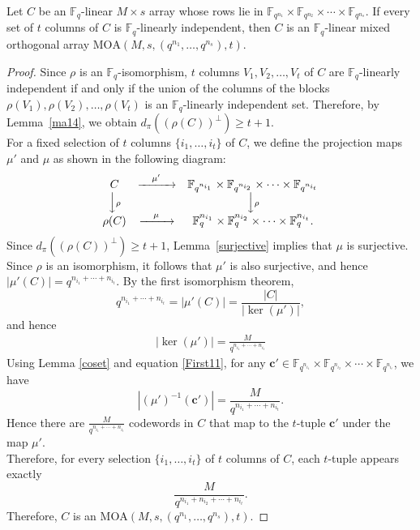 \documentclass[10pt,a4paper]{amsart}
\begin{document}
\begin{Theorem}\label{ma20}
Let $C$ be an $\mathbb F_q$-linear $M \times s$ array whose rows lie in $\mathbb{F}_{q^{n_1}}\times\mathbb{F}_{q^{n_2}}\times\cdots\times\mathbb{F}_{q^{n_s}}$. If every set of $t$ columns of $C$ is $\mathbb F_q$-linearly independent, then $C$ is an $\mathbb F_q$-linear mixed orthogonal array $\mathrm{MOA}\left(M, s, (q^{n_1}, \dots, q^{n_s}), t\right)$.
\end{Theorem}

\begin{proof}
Since $\rho$ is an $\mathbb F_q$-isomorphism, $t$ columns $V_1, V_2, \ldots, V_t$ of $C$ are $\mathbb F_q$-linearly independent if and only if the union of the columns of the blocks $\rho(V_1), \rho(V_2), \ldots, \rho(V_t)$ is an $\mathbb F_q$-linearly independent set. Therefore, by Lemma~\ref{ma14}, we obtain $d_\pi((\rho(C))^\perp)\geq t+1$.\\
For a fixed selection of $t$ columns $\{i_1,\ldots,i_t\}$ of $C$, we define the projection maps $\mu'$ and $\mu$ as shown in the following diagram:
  \begin{align}
\begin{array}{ccc}
C & \xrightarrow{\quad \mu'\quad} & \mathbb{F}_{q^{n_{i_1}}}\times\mathbb{F}_{q^{n_{i_2}}}\times\cdots\times\mathbb{F}_{q^{n_{i_t}}} \\
\Big\downarrow{\scriptstyle \rho} &  & \Big\downarrow{\scriptstyle \rho} \\
\rho(C) & \xrightarrow{\quad \mu \quad} & \mathbb{F}_{q}^{n_{i_1}}\times\mathbb{F}_{q}^{n_{i_2}}\times\cdots\times\mathbb{F}_{q}^{n_{i_t}}.
\end{array}
\end{align} 
Since $d_\pi((\rho(C))^\perp)\ge t+1$, Lemma~\ref{surjective} implies that $\mu$ is surjective. Since $\rho$ is an isomorphism, it follows that $\mu'$ is also surjective, and hence $ |\mu'(C)|=q^{n_{i_1} + \cdots + n_{i_t}}.$ By the first isomorphism theorem,
$$ q^{n_{i_1} + \cdots + n_{i_t}}=|\mu'(C)|= \frac{|C|}{|\ker(\mu')|},$$
and hence
\begin{align}\label{First11}
    |\ker(\mu')| = \frac{M}{q^{n_{i_1} + \cdots + n_{i_t}}}
\end{align}
Using Lemma \ref{coset} and equation \eqref{First11}, for any  $\boldsymbol{c}' \in  \mathbb{F}_{q^{n_{i_1}}} \times \mathbb{F}_{q^{n_{i_2}}}\times \cdots \times \mathbb{F}_{q^{n_{i_t}}}$,  we have 
$$
|(\mu')^{-1}(\boldsymbol{c}')|=\frac{M}{q^{n_{i_1} + \cdots + n_{i_t}}}.
$$
Hence there are $\frac{M}{q^{n_{i_1} + \cdots + n_{i_t}}}$ codewords in $C$ that map to the  $t$-tuple $\mathbf{c}'$ under the map $\mu'$. \\
Therefore, for every selection $\{i_1,\ldots,i_t\}$ of $t$ columns of $C$, each $t$-tuple appears exactly
$$\frac{M}{q^{n_{i_1} + n_{i_2} + \cdots + n_{i_t}}}.$$  Therefore, $C$ is an $ \mathrm{MOA}\left(M, s, (q^{n_1},\dots, q^{n_s}), t\right)$.
\end{proof}
\end{document}
